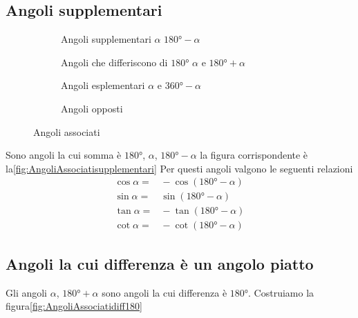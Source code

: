\subsection{Angoli supplementari}
\begin{figure}
	\centering
	\begin{subfigure}[b]{.48\linewidth}
	\centering
	\caption{Angoli supplementari $\alpha$ $\ang{180}-\alpha$}\label{fig:AngoliAssociatisupplementari}		
   \end{subfigure}
 \begin{subfigure}[b]{.48\linewidth}
 	\centering
 	
 	\caption{Angoli che differiscono di $\ang{180}$ $\alpha$ e $\ang{180}+\alpha$}
 	\label{fig:AngoliAssociatidiff180}	
 \end{subfigure}
 	\begin{subfigure}[b]{.49\linewidth}
 		\centering
 		
 		\caption{Angoli esplementari $\alpha$ e $\ang{360}-\alpha$}\label{fig:Angolidif360}
 	\end{subfigure}
 	\begin{subfigure}[b]{.49\linewidth}
 		\centering
 		
 		\caption{Angoli opposti}\label{fig:angoliopposti}
 	\end{subfigure}
\caption{Angoli associati}
	\label{fig:angoliassociatii}
\end{figure}
Sono angoli la cui somma è $\ang{180}$, $\alpha$, $\ang{180}-\alpha$ la figura corrispondente è la\nobs\vref{fig:AngoliAssociatisupplementari}
Per questi angoli valgono le seguenti relazioni
\begin{align*}
\cos\alpha=&{}-\cos(\ang{180}-\alpha)\\
\sin\alpha=&{}\sin(\ang{180}-\alpha)\\
\tan\alpha=&{}-\tan(\ang{180}-\alpha)\\
\cot\alpha=&{}-\cot(\ang{180}-\alpha)
\end{align*}
\subsection{Angoli la cui differenza è un angolo piatto}
\label{sub:Dif180}
Gli angoli $\alpha$, $\ang{180}+\alpha$ sono angoli la cui differenza è $\ang{180}$.  Costruiamo la figura\nobs\vref{fig:AngoliAssociatidiff180}

